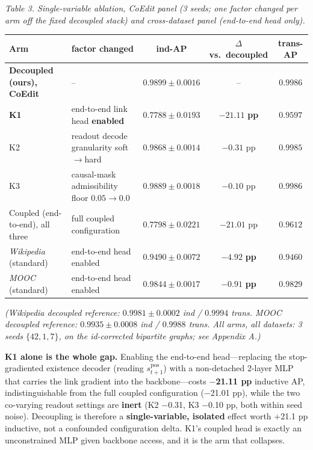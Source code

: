 \documentclass[conference]{IEEEtran}
\newcommand{\floatcap}[1]{{\footnotesize\itshape #1\par}}
\begin{document}
\begin{table}[t]
\centering
\floatcap{Table 3. Single-variable ablation, CoEdit panel (3 seeds; one factor changed per arm off the fixed decoupled stack) and cross-dataset panel (end-to-end head only).}
\small
\begin{tabular}{@{}llccc@{}}
\toprule
Arm & factor changed & ind-AP & $\Delta$ vs.\ decoupled & trans-AP \\
\midrule
\textbf{Decoupled (ours), CoEdit} & -- & $\mathbf{0.9899 \pm 0.0016}$ & -- & $0.9986$ \\
\textbf{K1} & end-to-end link head \textbf{enabled} & $\mathbf{0.7788 \pm 0.0193}$ & $\mathbf{-21.11}$ \textbf{pp} & $0.9597$ \\
K2 & readout decode granularity soft$\rightarrow$hard & $0.9868 \pm 0.0014$ & $-0.31$ pp & $0.9985$ \\
K3 & causal-mask admissibility floor $0.05\rightarrow0.0$ & $0.9889 \pm 0.0018$ & $-0.10$ pp & $0.9986$ \\
Coupled (end-to-end), all three & full coupled configuration & $0.7798 \pm 0.0221$ & $-21.01$ pp & $0.9612$ \\
\emph{Wikipedia} (standard) & end-to-end head enabled & $0.9490 \pm 0.0072$ & $\mathbf{-4.92}$ \textbf{pp} & $0.9460$ \\
\emph{MOOC} (standard) & end-to-end head enabled & $0.9844 \pm 0.0017$ & $\mathbf{-0.91}$ \textbf{pp} & $0.9829$ \\
\bottomrule
\end{tabular}
\par{\footnotesize \emph{(Wikipedia decoupled reference: $0.9981 \pm 0.0002$ ind / $0.9994$ trans. MOOC decoupled reference: $0.9935 \pm 0.0008$ ind / $0.9988$ trans. All arms, all datasets: 3 seeds $\{42, 1, 7\}$, on the id-corrected bipartite graphs; see Appendix A.)}}
\end{table}

\textbf{K1 alone is the whole gap.} Enabling the end-to-end head---replacing the stop-gradiented existence decoder (reading \(s^{\text{pos}}_{t+1}\)) with a non-detached 2-layer MLP that carries the link gradient into the backbone---costs \textbf{$-$21.11 pp} inductive AP, indistinguishable from the full coupled configuration ($-$21.01 pp), while the two co-varying readout settings are \textbf{inert} (K2 $-$0.31, K3 $-$0.10 pp, both within seed noise). Decoupling is therefore a \textbf{single-variable, isolated} effect worth +21.1 pp inductive, not a confounded configuration delta. K1's coupled head is exactly an unconstrained MLP given backbone access, and it is the arm that collapses.
\end{document}
